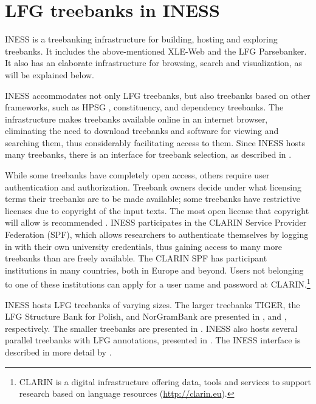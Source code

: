 \documentclass[output=paper,hidelinks]{langscibook}
\begin{document}
\section{LFG treebanks in INESS}\label{iness-treebanks}

INESS is a treebanking infrastructure for building, hosting and exploring treebanks.
It includes the above-mentioned XLE-Web and the LFG Parsebanker.
It also has an elaborate infrastructure for browsing, search and visualization, as will be explained below.

INESS accommodates not only LFG treebanks, but also treebanks based on other frameworks, such as HPSG \citep{pollard1994head-driven}, constituency, and dependency treebanks.
The infrastructure makes treebanks available online in an internet browser, eliminating the need to download treebanks and software for viewing and searching them, thus considerably facilitating access to them.
Since INESS hosts many treebanks, there is an interface for treebank selection, as described in .

While some treebanks have completely open access, others require user authentication and authorization.
Treebank owners decide under what licensing terms their treebanks are to be made available; some treebanks have restrictive licenses due to copyright of the input texts.
The most open license that copyright will allow is recommended \citep{Rosen21Managing}.
INESS participates in the CLARIN Service Provider Federation (SPF), which allows researchers to authenticate themselves by logging in with their own university credentials, thus gaining access to many more treebanks than are freely available.
The CLARIN SPF has participant institutions in many countries, both in Europe and beyond.
Users not belonging to one of these institutions can apply for a user name and password at CLARIN.\footnote{CLARIN is a digital infrastructure offering data, tools and services to support research based on language resources (\url{http://clarin.eu}).}

INESS hosts LFG treebanks of varying sizes.
The larger treebanks TIGER, the LFG Structure Bank for Polish, and NorGramBank are presented in ,  and , respectively.
The smaller treebanks are presented in .
INESS also hosts several parallel treebanks with LFG annotations, presented in .
The INESS interface is described in more detail by \citet{Meurer20Interactive}. %
\end{document}
